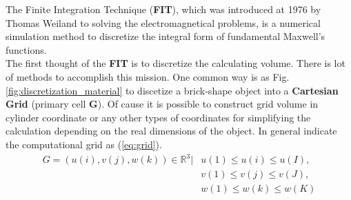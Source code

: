 The Finite Integration Technique (\textbf{FIT}), which was introduced at 1976 by Thomas Weiland\cite{FIT_discrete_method} to solving the electromagnetical problems, is a numerical simulation method to discretize the integral form of fundamental Maxwell's functions.\\

The first thought of the \textbf{FIT} is to discretize the calculating volume. There is lot of methods to accomplish this mission. One common way is as Fig. \ref{fig:discretization_material} to discetize a brick-shape object into a \textbf{Cartesian Grid} (primary cell \textbf{G}). Of cause it is possible to construct grid volume in cylinder coordinate or any other types of  coordinates\cite{FIT_triangular_discretization,FDTD_nonorthogonal_grids} for simplifying the calculation depending on the real dimensions of the object. In general \cite{script_FeldSim} indicate the computational grid as (\ref{eq:grid}).\\
\begin{align}
G=
(u(i),v(j),w(k))\in \mathbb{R}^3|&u(1)\leq u(i)\leq u(I),\nonumber\\
													 &v(1)\leq v(j)\leq v(J),\nonumber\\ 
													 &w(1)\leq w(k)\leq w(K)
\label{eq:grid}
\end{align}

